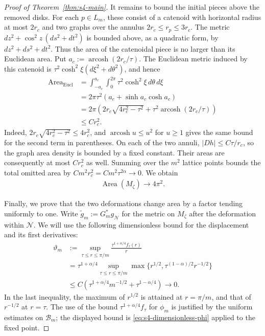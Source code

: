 \documentclass[a4paper,11pt,oneside,reqno]{amsart}
\numberwithin{equation}{section}
\theoremstyle{definition}
\begin{document}
\begin{proof}[Proof of Theorem~\ref{thm:s4-main}]
    It remains to bound the initial pieces above the removed
    disks. For each $p\in L_m$, these consist of a catenoid
    with horizontal radius at most $2r_c$ and two graphs
    over the annulus $2r_c\leq r_p\leq3r_c$. The metric
    $dz^2+\cos^2z\,(ds^2+dt^2)$ is bounded above, as a
    quadratic form, by $dz^2+ds^2+dt^2$. Thus the area of
    the catenoidal piece is no larger than its Euclidean
    area. Put $a_c:=\operatorname{arcosh}(2r_c/\tau)$.
    The Euclidean metric induced by this catenoid is
    $\tau^2\cosh^2\xi(d\xi^2+d\theta^2)$, and hence
    \begin{align*}
        \operatorname{Area}_{\mathrm{Eucl}}
        &=\int_{-a_c}^{a_c}\int_0^{2\pi}
             \tau^2\cosh^2\xi\,d\theta\,d\xi\\
        &=2\pi\tau^2(a_c+\sinh a_c\cosh a_c)\\
        &=2\pi\left(
             2r_c\sqrt{4r_c^2-\tau^2}
             +\tau^2\operatorname{arcosh}(2r_c/\tau)
             \right)\\
        &\leq Cr_c^2.
    \end{align*}
    Indeed, $2r_c\sqrt{4r_c^2-\tau^2}\leq4r_c^2$,
    and $\operatorname{arcosh}u\leq u^2$ for $u\geq1$
    gives the same bound for the second term in parentheses.
    On each of the two annuli, $|Dh|\leq C\tau/r_c$,
    so the graph area density is bounded by a fixed
    constant. Their areas are consequently at most $Cr_c^2$
    as well. Summing over the $m^2$ lattice points bounds
    the total omitted area by
    $Cm^2r_c^2=Cm^2\tau^{2\alpha}\to0$. We obtain
    \begin{align}
        \label{eq:s4-initial-area-limit}
        \operatorname{Area}(M_\zeta)\rightarrow4\pi^2.
    \end{align}

    Finally, we prove that the two deformations change area
    by a factor tending uniformly to one. Write
    $\widetilde g_m:=G_m^*g_{\mathcal N}$ for the metric
    on $M_\zeta$ after the deformation within $\mathcal N$.
    We will use the following dimensionless bound for the
    displacement and its first derivatives:
    \begin{align*}
        \vartheta_m&:=\sup_{\tau\leq r\leq\pi/m}
              \frac{\tau^{1+\alpha/4}f_\tau(r)}r\\
        &=\tau^{1+\alpha/4}
          \sup_{\tau\leq r\leq\pi/m}
          \max\{r^{1/2},\tau^{(1-\alpha)/2}r^{-1/2}\}\\
        &\leq C\left(
             \tau^{1+\alpha/4}m^{-1/2}
             +\tau^{1-\alpha/4}\right)
          \rightarrow0.
    \end{align*}
    In the last inequality, the maximum of $r^{1/2}$ is
    attained at $r=\pi/m$, and that of $r^{-1/2}$ at
    $r=\tau$. The use of the bound
    $\tau^{1+\alpha/4}f_\tau$ for $\phi_m$ is justified
    by the uniform estimates on $\mathcal B_m$; the displayed
    bound is \eqref{eq:s4-dimensionless-phi} applied to the
    fixed point.


\end{proof}
\end{document}
